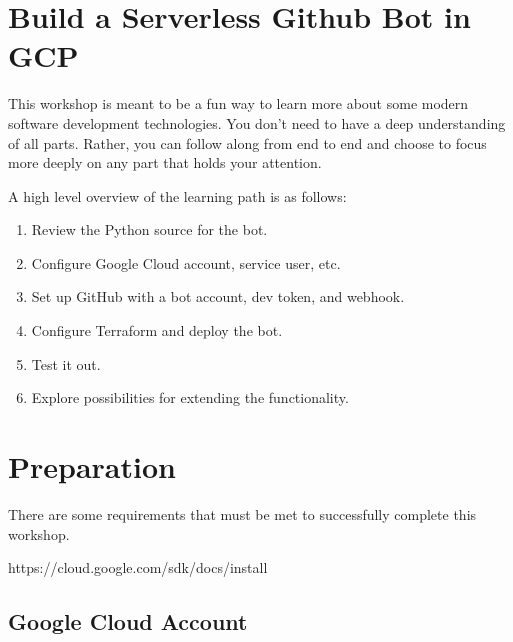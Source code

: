 







\section{\label{sec:Start}Build a Serverless Github Bot in GCP}
\vspace{2mm}

\justifying
This workshop is meant to be a fun way to learn more about some modern software development technologies. You don't need to have a deep understanding of all parts. Rather, you can follow along from end to end and choose to focus more deeply on any part that holds your attention.

\justifying
A high level overview of the learning path is as follows:

\begin{raggedright}
	\begin{enumerate}
		\item Review the Python source for the bot.
		\item Configure Google Cloud account, service user, etc.
		\item Set up GitHub with a bot account, dev token, and webhook.
		\item Configure Terraform and deploy the bot.
		\item Test it out.
		\item Explore possibilities for extending the functionality.
	\end{enumerate}
\end{raggedright}
\vspace{2mm}

\section{\label{sec:preparation}Preparation}

\justifying
There are some requirements that must be met to successfully complete this workshop.

https://cloud.google.com/sdk/docs/install

\subsection{\label{sec:account}Google Cloud Account}

